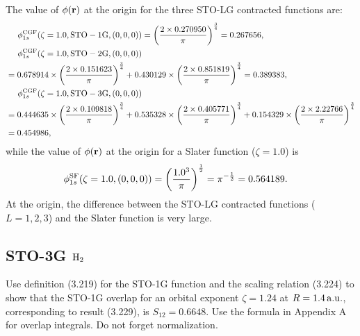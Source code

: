 \documentclass[a4paper]{book}
\newcounter{exercise}[chapter]
\newcounter{solution}[chapter]
\newcommand{\au}{{\rm a.u.}}
\newcommand{\bfr}{{\bf r}}
\begin{document}
	\begin{solution}
	
	The value of $\phi(\bfr)$ at the origin for the three STO-LG contracted functions are:
	\begin{align*}
		&\hspace{1.4em}\phi^{\rm CGF}_{1s}(\zeta = 1.0, {\rm STO-1G}, (0,0,0)) = \left( \frac{ 2 \times 0.270950 }{ \pi } \right)^{ \frac{3}{4} } = 0.267656 , \\
		&\hspace{1.4em}\phi^{\rm CGF}_{1s}(\zeta = 1.0, {\rm STO-2G}, (0,0,0)) \\
		&= 0.678914 \times \left( \frac{ 2 \times 0.151623 }{ \pi } \right)^{ \frac{3}{4} } + 0.430129 \times \left( \frac{ 2 \times 0.851819 }{ \pi } \right)^{ \frac{3}{4} } = 0.389383 , \\
		&\hspace{1.4em}\phi^{\rm CGF}_{1s}(\zeta = 1.0, {\rm STO-3G}, (0,0,0)) \\
		&= 0.444635 \times \left( \frac{ 2 \times 0.109818 }{ \pi } \right)^{ \frac{3}{4} } + 0.535328 \times \left( \frac{ 2 \times 0.405771 }{ \pi } \right)^{ \frac{3}{4} } + 0.154329 \times \left( \frac{ 2 \times 2.22766 }{ \pi } \right)^{ \frac{3}{4} } \\
		&= 0.454986 ,
	\end{align*}
	while the value of $\phi(\bfr)$ at the origin for a Slater function ($\zeta= 1.0$) is
	\begin{align*}
		\phi^{\rm SF}_{1s}(\zeta = 1.0, (0,0,0)) &= \left( \frac{ 1.0^3 }{ \pi } \right)^{ \frac{1}{2} } = \pi^{-\frac{1}{2}} = 0.564189 .
	\end{align*}
	At the origin, the difference between the STO-LG contracted functions ($L=1,2,3$) and the Slater function is very large.
	
	\end{solution}
	
	\subsection{STO-3G \texorpdfstring{$\ce{H2}$}-}
	
	\begin{exercise}
	Use definition (3.219) for the STO-1G function and the scaling relation (3.224) to show that the STO-1G overlap for an orbital exponent $\zeta = 1.24$ at $R = 1.4\,\au$, corresponding to result (3.229), is $S_{12} = 0.6648$. Use the formula in Appendix A for overlap integrals. Do not forget normalization.
	\end{exercise}
	
\end{document}
